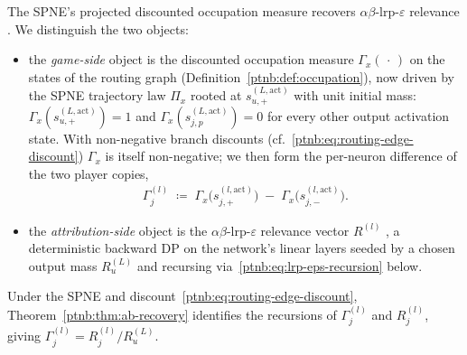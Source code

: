 The SPNE's projected discounted occupation measure recovers
$\alpha\beta$-\ac{lrp}-$\varepsilon$ relevance . We distinguish the two objects:
\begin{itemize}
    \item the \emph{game-side} object is the discounted occupation measure $\Gamma_x(\,\cdot\,)$ on the
        states of the routing graph (Definition~\ref{ptnb:def:occupation}), now driven by the SPNE trajectory
        law $\Pi_x$ rooted at $s_{u,+}^{(L,\mathrm{act})}$ with unit initial mass:
        $\Gamma_x(s_{u,+}^{(L,\mathrm{act})}) = 1$ and $\Gamma_x(s_{j,p}^{(L,\mathrm{act})}) = 0$ for every
        other output activation state. With non-negative branch discounts
        (cf.~\eqref{ptnb:eq:routing-edge-discount}) $\Gamma_x$ is itself non-negative; we then form the
        per-neuron difference of the two player copies,
        \begin{align}\label{ptnb:eq:routing-Gamma-pair}
            \Gamma^{(l)}_j \;\coloneqq\;
            \Gamma_x\!\bigl(s_{j,+}^{(l,\mathrm{act})}\bigr)
            \;-\;
            \Gamma_x\!\bigl(s_{j,-}^{(l,\mathrm{act})}\bigr).
        \end{align}
    \item the \emph{attribution-side} object is the $\alpha\beta$-\ac{lrp}-$\varepsilon$ relevance
        vector $R^{(l)}$ , a deterministic backward DP on the network's linear layers
        seeded by a chosen output mass $R_u^{(L)}$ and recursing via~\eqref{ptnb:eq:lrp-eps-recursion} below.
\end{itemize}
Under the SPNE and discount~\eqref{ptnb:eq:routing-edge-discount},
Theorem~\ref{ptnb:thm:ab-recovery} identifies the recursions of $\Gamma^{(l)}_j$ and $R^{(l)}_j$,
giving $\Gamma^{(l)}_j=R^{(l)}_j/R^{(L)}_u$.

